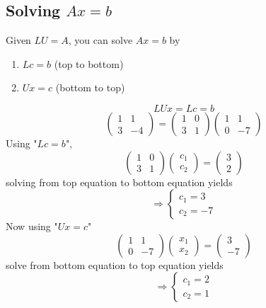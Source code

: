 \documentclass[11pt]{article}
\begin{document}
\subsection{Solving \texorpdfstring{$Ax = b$}{Ax = b}}
Given $LU = A$, you can solve $Ax =b$ by
\begin{enumerate}
    \item $Lc = b$ (top to bottom)
    \item $Ux = c$ (bottom to top)
\end{enumerate}

\begin{example}
    \[
        LUx = Lc = b
    \]
    \[
    \begin{pmatrix}
        1 & 1 \\
        3 & -4
    \end{pmatrix} = \begin{pmatrix}
        1 & 0 \\
        3 & 1
    \end{pmatrix}\begin{pmatrix}
        1 & 1 \\
        0 & -7
    \end{pmatrix}
    \]
    Using "$Lc = b$", 
    \[
       \begin{pmatrix}
        1 & 0 \\
        3 & 1
    \end{pmatrix}\begin{pmatrix}
        c_1 \\
        c_2
    \end{pmatrix} =
        \begin{pmatrix}
            3\\
            2
        \end{pmatrix}
    \]
    solving from top equation to bottom equation yields
    \[
        \Rightarrow \begin{cases}
            c_1 = 3  \\
            c_2 = -7 
        \end{cases}
    \]
    Now using "$Ux = c$"
    \[
       \begin{pmatrix}
        1 & 1 \\
        0 & -7
    \end{pmatrix} \begin{pmatrix}
        x_1 \\ x_2
    \end{pmatrix} = \begin{pmatrix}
        3 \\ -7
    \end{pmatrix}
    \]
    solve from bottom equation to top equation yields
       \[
        \Rightarrow \begin{cases}
            c_1 = 2  \\
            c_2 = 1
        \end{cases}
    \] 
    
\end{example}
\end{document}
